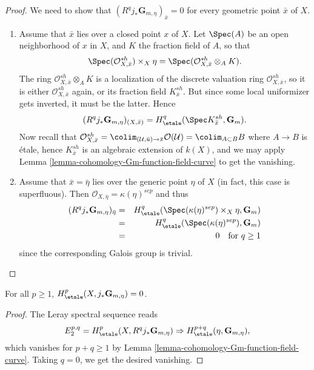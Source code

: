 \begin{proof}
We need to show that $(R^q j_*\mathbf{G}_{m, \eta})_{\bar x} = 0$ for every
geometric point $\bar x$ of $X$.
\begin{enumerate}
\item
Assume that $\bar x$ lies over a closed point $x$ of $X$. Let $\Spec(A)$
be an open neighborhood of $x$ in $X$, and $K$ the fraction field of $A$, so
that
$$
\Spec(\mathcal{O}^{sh}_{X, \bar x}) \times_X \eta =
\Spec(\mathcal{O}^{sh}_{X, \bar x} \otimes_A K).
$$
The ring $\mathcal{O}^{sh}_{X, \bar x} \otimes_A K$ is a localization of
the discrete valuation ring $\mathcal{O}^{sh}_{X, \bar x}$, so it is either
$\mathcal{O}^{sh}_{X, \bar x}$ again, or its fraction field
$K^{sh}_{\bar x}$. But since some local uniformizer gets inverted, it must
be the latter. Hence
$$
(R^q j_*\mathbf{G}_{m, \eta})_{(X, \bar x)} = H_\etale^q(\Spec
K^{sh}_{\bar x}, \mathbf{G}_m).
$$
Now recall that $\mathcal{O}^{sh}_{X, \bar x} =
\colim_{(\mathcal{U}, \bar u) \to \bar x} \mathcal{O} (\mathcal{U}) =
\colim_{A \subset B} B$ where $A \to B$ is \'etale, hence
$K^{sh}_{\bar x}$ is an algebraic extension of $k(X)$, and we may apply
Lemma \ref{lemma-cohomology-Gm-function-field-curve}
to get the vanishing.
\item
Assume that $\bar x = \bar \eta$ lies over the generic point $\eta$ of $X$ (in
fact, this case is superfluous). Then $\mathcal{O}_{X, \bar \eta} =
\kappa(\eta)^{sep}$ and thus
\begin{eqnarray*}
(R^q j_*\mathbf{G}_{m, \eta})_{\bar \eta}
& = &
H_\etale^q(\Spec(\kappa(\eta)^{sep}) \times_X \eta, \mathbf{G}_m) \\
& = & H_\etale^q (\Spec(\kappa(\eta)^{sep}), \mathbf{G}_m) \\
& = & 0 \ \ \text{ for } q \geq 1
\end{eqnarray*}
since the corresponding Galois group is trivial.
\end{enumerate}
\end{proof}

\begin{lemma}
\label{lemma-cohomology-jstar-Gm}
For all $p \geq 1$, $H_\etale^p(X, j_*\mathbf{G}_{m, \eta}) = 0$.
\end{lemma}

\begin{proof}
The Leray spectral sequence reads
$$
E_2^{p, q} = H_\etale^p(X, R^qj_*\mathbf{G}_{m, \eta}) \Rightarrow
H_\etale^{p+q}(\eta, \mathbf{G}_{m, \eta}),
$$
which vanishes for $p+q \geq 1$ by
Lemma \ref{lemma-cohomology-Gm-function-field-curve}. Taking
$q = 0$, we get the desired vanishing.
\end{proof}

